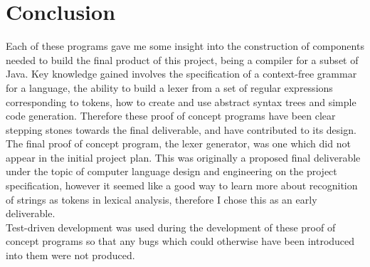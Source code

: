 \documentclass[a4paper, 11pt]{article}
\begin{document}
\section{Conclusion}
Each of these programs gave me some insight into the construction of components needed to build the final product of this project, being a compiler for a subset of Java. Key knowledge gained involves the specification of a context-free grammar for a language, the ability to build a lexer from a set of regular expressions corresponding to tokens, how to create and use abstract syntax trees and simple code generation. Therefore these proof of concept programs have been clear stepping stones towards the final deliverable, and have contributed to its design.
\\\newline
The final proof of concept program, the lexer generator, was one which did not appear in the initial project plan. This was originally a proposed final deliverable under the topic of computer language design and engineering on the project specification, however it seemed like a good way to learn more about recognition of strings as tokens in lexical analysis, therefore I chose this as an early deliverable.
\\\newline
Test-driven development was used during the development of these proof of concept programs so that any bugs which could otherwise have been introduced into them were not produced.

\clearpage
\setcounter{section}{0}
\end{document}
